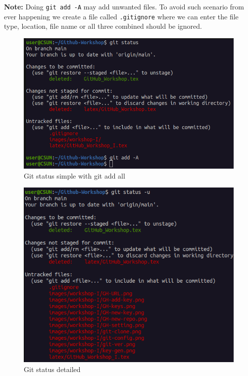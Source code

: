 \documentclass[12pt, a4paper]{article}
\begin{document}
\textbf{Note:} Doing \texttt{git add -A} may add unwanted files. To avoid such scenario from ever happening we create a file called \verb+.gitignore+ where we can enter the file type, location, file name or all three combined should be ignored.
\begin{figure}[H]
\centering
\includegraphics[scale=0.5]{../images/workshop-I/git-add.png}
\caption{Git status simple with git add all}
\end{figure}
\begin{figure}[H]
\centering
\includegraphics[scale=0.5]{../images/workshop-I/git-status-u.png}
\caption{Git status detailed}
\end{figure}
\end{document}
